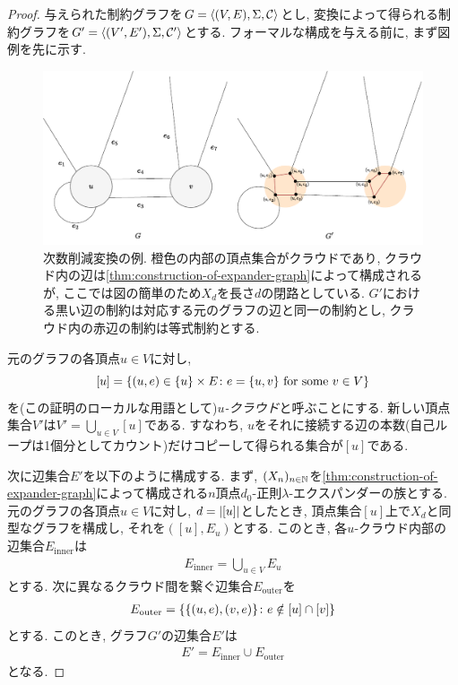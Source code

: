 \begin{proof}

与えられた制約グラフを$G=\langle(V,E),\Sigma,\mathcal{C}\rangle$とし, 変換によって得られる制約グラフを$G'=\langle(V',E'),\Sigma,\mathcal{C}'\rangle$とする.
フォーマルな構成を与える前に, まず図例を先に示す.

\begin{figure}[ht]
  \centering
  \includegraphics[width=\textwidth]{images/degree_reduction.pdf}
  \caption{次数削減変換の例. 橙色の内部の頂点集合がクラウドであり, クラウド内の辺は\cref{thm:construction-of-expander-graph}によって構成されるが, ここでは図の簡単のため$X_d$を長さ$d$の閉路としている. $G'$における黒い辺の制約は対応する元のグラフの辺と同一の制約とし, クラウド内の赤辺の制約は等式制約とする.}
  \label{fig:degree-reduction}
\end{figure}

元のグラフの各頂点$u\in V$に対し, 
\[[u]=\qty{ (u,e) \in \{u\}\times E \colon e=\{u,v\} \text{ for some } v\in V }\]
を(この証明のローカルな用語として)\emph{$u$-クラウド}と呼ぶことにする.
新しい頂点集合$V'$は$V'=\bigcup_{u\in V} [u]$である.
すなわち, $u$をそれに接続する辺の本数(自己ループは1個分としてカウント)だけコピーして得られる集合が$[u]$である.

次に辺集合$E'$を以下のように構成する.
まず, $(X_n)_{n\in\mathbb{N}}$を\cref{thm:construction-of-expander-graph}によって構成される$n$頂点$d_0$-正則$\lambda$-エクスパンダーの族とする.
元のグラフの各頂点$u\in V$に対し, $d=\abs{[u]}$としたとき, 頂点集合$[u]$上で$X_d$と同型なグラフを構成し, それを$([u],E_u)$とする.
このとき, 各$u$-クラウド内部の辺集合$E_{\mathrm{inner}}$は
\begin{align*}
  E_{\mathrm{inner}} = \bigcup_{u\in V} E_u
\end{align*}
とする.
次に異なるクラウド間を繋ぐ辺集合$E_{\mathrm{outer}}$を
\begin{align*}
  E_{\mathrm{outer}} = \qty{\qty{ (u,e), (v,e) } \colon e\notin [u]\cap[v]}
\end{align*}
とする.
このとき, グラフ$G'$の辺集合$E'$は
\begin{align*}
  E' = E_{\mathrm{inner}} \cup E_{\mathrm{outer}}
\end{align*}
となる.


\end{proof}
